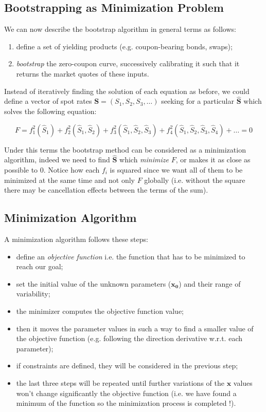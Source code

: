\subsection{Bootstrapping as Minimization Problem}
We can now describe the bootstrap algorithm in general terms as follows:
\begin{enumerate}
\item define a set of yielding products (e.g. coupon-bearing bonds, swaps);
\item \emph{bootstrap} the zero-coupon curve, successively calibrating it such that it returns the market quotes of these inputs.
\end{enumerate}

Instead of iteratively finding the solution of each equation as before, we could define a vector of spot rates $\mathbf{S} = (S_1, S_2, S_3, \ldots)$ seeking for a particular $\mathbf{\hat{S}}$ which solves the following equation:

\begin{equation}
F = f_1^2(\hat{S}_1) + f_2^2(\hat{S}_1, \hat{S}_2) + f_3^2(\hat{S}_1, \hat{S}_2, \hat{S}_3) + f_4^2(\hat{S}_1, \hat{S}_2, \hat{S}_3, \hat{S}_4) + \ldots = 0
\end{equation}

Under this terms the bootstrap method can be considered as a minimization algorithm, indeed we need to find $\mathbf{\hat{S}}$ which \emph{minimize} $F$, or makes it as close as possible to 0.
Notice how each \(f_i\) is squared since we want all of them to be minimized at the same time and not only \(F\) globally (i.e. without the square there may be cancellation effects between the terms of the sum).

\subsection{Minimization Algorithm}\label{minimization-algorithm}

A minimization algorithm follows these steps:

\begin{itemize}
\tightlist
\item
  define an \emph{objective function} i.e. the function that has to be
  minimized to reach our goal;
\item
  set the initial value of the unknown parameters (\(\mathbf{x_0}\)) and their range of
  variability;
\item
  the minimizer computes the objective function value;
\item
  then it moves the parameter values in such a way to find a smaller
  value of the objective function (e.g. following the direction derivative w.r.t.
  each parameter);
\item if constraints are defined, they will be considered in the previous step;
\item
  the last three steps will be repeated until further variations of the
  \(\mathbf{x}\) values won't change significantly the objective
  function (i.e. we have found a minimum of the function so the
  minimization process is completed !).
\end{itemize}

